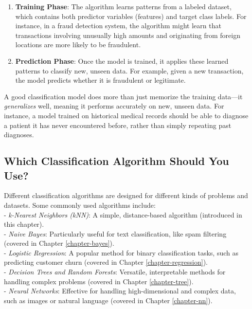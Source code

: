 \documentclass[
]{book}
\providecommand{\tightlist}{%
  \setlength{\itemsep}{0pt}\setlength{\parskip}{0pt}}
\theoremstyle{definition}
\theoremstyle{definition}
\theoremstyle{definition}
\theoremstyle{definition}
\theoremstyle{remark}
\begin{document}
\begin{enumerate}
\def\labelenumi{\arabic{enumi}.}
\tightlist
\item
  \textbf{Training Phase}: The algorithm learns patterns from a labeled dataset, which contains both predictor variables (features) and target class labels. For instance, in a fraud detection system, the algorithm might learn that transactions involving unusually high amounts and originating from foreign locations are more likely to be fraudulent.\\
\item
  \textbf{Prediction Phase}: Once the model is trained, it applies these learned patterns to classify new, unseen data. For example, given a new transaction, the model predicts whether it is fraudulent or legitimate.
\end{enumerate}

A good classification model does more than just memorize the training data---it \emph{generalizes} well, meaning it performs accurately on new, unseen data. For instance, a model trained on historical medical records should be able to diagnose a patient it has never encountered before, rather than simply repeating past diagnoses.

\subsection*{Which Classification Algorithm Should You Use?}\label{which-classification-algorithm-should-you-use}

Different classification algorithms are designed for different kinds of problems and datasets. Some commonly used algorithms include:\\
- \emph{k-Nearest Neighbors (kNN)}: A simple, distance-based algorithm (introduced in this chapter).\\
- \emph{Naive Bayes}: Particularly useful for text classification, like spam filtering (covered in Chapter \ref{chapter-bayes}).\\
- \emph{Logistic Regression}: A popular method for binary classification tasks, such as predicting customer churn (covered in Chapter \ref{chapter-regression}).\\
- \emph{Decision Trees and Random Forests}: Versatile, interpretable methods for handling complex problems (covered in Chapter \ref{chapter-tree}).\\
- \emph{Neural Networks}: Effective for handling high-dimensional and complex data, such as images or natural language (covered in Chapter \ref{chapter-nn}).
\end{document}
